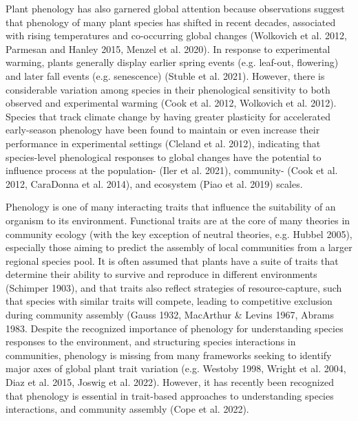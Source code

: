 \documentclass[11pt]{article}
\begin{document}
Plant phenology has also garnered global attention because observations suggest that phenology of many plant species has shifted in recent decades, associated with rising temperatures and co-occurring global changes (Wolkovich et al. 2012, Parmesan and Hanley 2015, Menzel et al. 2020). In response to experimental warming, plants generally display earlier spring events (e.g. leaf-out, flowering) and later fall events (e.g. senescence) (Stuble et al. 2021). However, there is considerable variation among species in their phenological sensitivity to both observed and experimental warming (Cook et al. 2012, Wolkovich et al. 2012). Species that track climate change by having greater plasticity for accelerated early-season phenology have been found to maintain or even increase their performance in experimental settings (Cleland et al. 2012), indicating that species-level phenological responses to global changes have the potential to influence process at the population- (Iler et al. 2021), community- (Cook et al. 2012, CaraDonna et al. 2014), and ecosystem (Piao et al. 2019) scales.

Phenology is one of many interacting traits that influence the suitability of an organism to its environment. Functional traits are at the core of many theories in community ecology (with the key exception of neutral theories, e.g. Hubbel 2005), especially those aiming to predict the assembly of local communities from a larger regional species pool. It is often assumed that plants have a suite of traits that determine their ability to survive and reproduce in different environments (Schimper 1903), and that traits also reflect strategies of resource-capture, such that species with similar traits will compete, leading to competitive exclusion during community assembly (Gauss 1932, MacArthur \& Levins 1967, Abrams 1983. Despite the recognized importance of phenology for understanding species responses to the environment, and structuring species interactions in communities, phenology is missing from many frameworks seeking to identify major axes of global plant trait variation (e.g. Westoby 1998, Wright et al. 2004, Diaz et al. 2015, Joswig et al. 2022). However, it has recently been recognized that phenology is essential in trait-based approaches to understanding species interactions, and community assembly (Cope et al. 2022).
\end{document}
